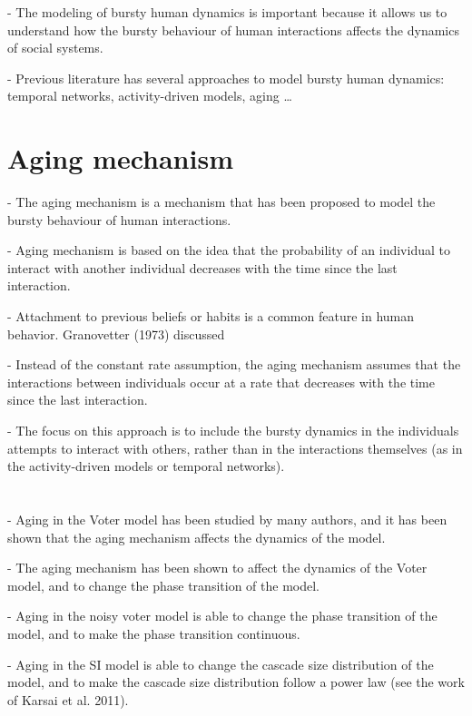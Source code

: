 - The modeling of bursty human dynamics is important because it allows us to understand how the bursty behaviour of human interactions affects the dynamics of social systems.

- Previous literature has several approaches to model bursty human dynamics: temporal networks, activity-driven models, aging \dots

\section{\label{sec:Aging mechanism} Aging mechanism}

- The aging mechanism is a mechanism that has been proposed to model the bursty behaviour of human interactions.

- Aging mechanism is based on the idea that the probability of an individual to interact with another individual decreases with the time since the last interaction.

- Attachment to previous beliefs or habits is a common feature in human behavior. Granovetter (1973) discussed 

- Instead of the constant rate assumption, the aging mechanism assumes that the interactions between individuals occur at a rate that decreases with the time since the last interaction.

- The focus on this approach is to include the bursty dynamics in the individuals attempts to interact with others, rather than in the interactions themselves (as in the activity-driven models or temporal networks).

\section{\label{sec:Aging in Simple Contagion}}

- Aging in the Voter model has been studied by many authors, and it has been shown that the aging mechanism affects the dynamics of the model.

- The aging mechanism has been shown to affect the dynamics of the Voter model, and to change the phase transition of the model.

- Aging in the noisy voter model is able to change the phase transition of the model, and to make the phase transition continuous.

- Aging in the SI model is able to change the cascade size distribution of the model, and to make the cascade size distribution follow a power law (see the work of Karsai et al. 2011).